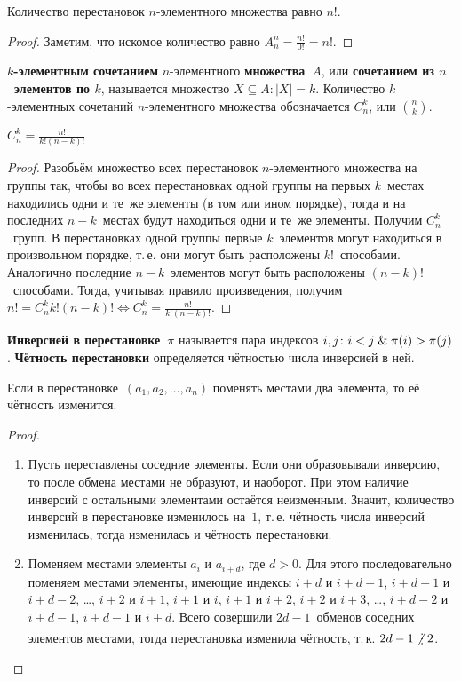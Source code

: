 \begin{consequent}
Количество перестановок $n$-элементного множества равно $n!$.
\end{consequent}
\begin{proof}
Заметим, что искомое количество равно $A_n^n = \frac{n!}{0!} = n!$.
\end{proof}

 \textbf{$k$-элементным сочетанием} $n$-элементного \textbf{множества~$A$}, или \textbf{сочетанием из $n$~элементов по $k$}, называется множество $X \subseteq A \colon |X| = k$.
Количество $k$-элементных сочетаний $n$-элементного множества обозначается $C_n^k$, или $\binom{n}{k}$.

\begin{statement}
$C_n^k = \frac{n!}{k! (n - k)!}$
\end{statement}
\begin{proof}
Разобьём множество всех перестановок $n$-элементного множества на группы так, чтобы во всех перестановках одной группы на первых $k$~местах находились одни и те~же элементы (в том или ином порядке), тогда и на последних $n - k$~местах будут находиться одни и те~же элементы.
Получим $C_n^k$~групп.
В перестановках одной группы первые $k$~элементов могут находиться в произвольном порядке, т.\,е. они могут быть расположены $k!$~способами.
Аналогично последние $n - k$~элементов могут быть расположены $(n - k)!$~способами.
Тогда, учитывая правило произведения, получим $n! = C_n^k k! (n - k)! \Leftrightarrow C_n^k = \frac{n!}{k! (n - k)!}$.
\end{proof}

 \textbf{Инверсией в перестановке~$\pi$} называется пара индексов $i, j \colon i < j \mathrel{\&} \pi(i) > \pi(j)$.
\textbf{Чётность перестановки} определяется чётностью числа инверсией в ней.

\begin{statement}
\label{st:parity_of_permutation}
Если в перестановке~$(a_1, a_2, \ldots, a_n)$ поменять местами два элемента, то её чётность изменится.
\end{statement}
\begin{proof}
\begin{enumerate}
	\item Пусть переставлены соседние элементы.
	Если они образовывали инверсию, то после обмена местами не образуют, и наоборот.
	При этом наличие инверсий с остальными элементами остаётся неизменным.
	Значит, количество инверсий в перестановке изменилось на~$1$, т.\,е. чётность числа инверсий изменилась, тогда изменилась и чётность перестановки.
	
	\item Поменяем местами элементы $a_i$ и $a_{i+d}$, где $d > 0$.
	Для этого последовательно поменяем местами элементы, имеющие индексы $i+d$ и $i+d-1$, $i+d-1$ и $i+d-2$, \ldots, $i+2$ и $i+1$, $i+1$ и $i$, $i+1$ и $i+2$, $i+2$ и $i+3$, \ldots, $i+d-2$ и $i+d-1$, $i+d-1$ и $i+d$.
	Всего совершили $2d - 1$~обменов соседних элементов местами, тогда перестановка изменила чётность, т.\,к. $2d - 1 \notmult 2$.
\end{enumerate}
\end{proof}